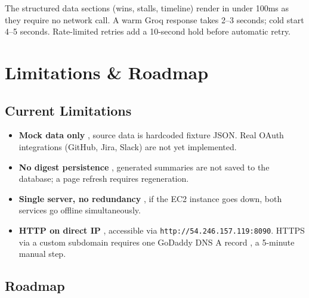 \documentclass[12pt,a4paper]{article}
\begin{document}
The structured data sections (wins, stalls, timeline) render in under 100ms as they require no network call. A warm Groq response takes 2–3 seconds; cold start 4–5 seconds. Rate-limited retries add a 10-second hold before automatic retry.

\section{Limitations \& Roadmap}

\subsection{Current Limitations}

\begin{itemize}
  \item \textbf{Mock data only} , source data is hardcoded fixture JSON. Real OAuth integrations (GitHub, Jira, Slack) are not yet implemented.
  \item \textbf{No digest persistence} , generated summaries are not saved to the database; a page refresh requires regeneration.
  \item \textbf{Single server, no redundancy} , if the EC2 instance goes down, both services go offline simultaneously.
  \item \textbf{HTTP on direct IP} , accessible via \texttt{http://54.246.157.119:8090}. HTTPS via a custom subdomain requires one GoDaddy DNS A record , a 5-minute manual step.
\end{itemize}

\subsection{Roadmap}
\end{document}
